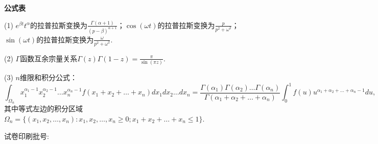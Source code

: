 \documentclass[CJK]{article}
\begin{document}
  {\vskip 6.2in}
{\noindent \bf 公式表}
\bitem
  \item[(1)]{$e^{\beta t} t^\alpha$的拉普拉斯变换为$\frac{\Gamma(\alpha+1)}{(p-\beta)^{\alpha+1}}$；$\cos(\omega t)$的拉普拉斯变换为$\frac{p}{p^2+\omega^2}$；$\sin(\omega t)$的拉普拉斯变换为$\frac{\omega}{p^2+\omega^2}$.}
  \item[(2)]{$\Gamma$函数互余宗量关系$\Gamma(z)\Gamma(1-z) = \frac{\pi}{\sin{(\pi z)}}.$}
  \item[(3)]{$n$维限和积分公式：
 $$\int_{\Omega_n} x_1^{\alpha_1-1}x_2^{\alpha_2-1}\ldots x_n^{\alpha_n-1} f(x_1+x_2+\ldots+x_n)dx_1dx_2\ldots dx_n= \frac{\Gamma(\alpha_1)\Gamma(\alpha_2)\ldots \Gamma(\alpha_n)}{\Gamma(\alpha_1+\alpha_2+\ldots + \alpha_n)}\int_0^1f(u)u^{\alpha_1+\alpha_2+\ldots + \alpha_n-1} du ,$$
  其中等式左边的积分区域$\Omega_n = \{(x_1,x_2,\ldots,x_n): x_1,x_2,\ldots, x_n\ge 0; x_1+x_2+\ldots+x_n\le 1 \}$.
  }
    \eitem

{\vskip 0.02in}

\bcenter
    {\scriptsize 试卷印刷批号: \version}
\ecenter
\ech
\end{document}
